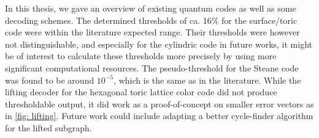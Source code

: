 In this thesis, we gave an overview of existing
quantum codes as well as some decoding schemes.
The determined thresholds of ca. 16\% for the surface/toric code were
within the literature expected range. 
Their thresholds were however not distinguishable, and
especially for the cylindric code in future works, it might be of interest to 
calculate these thresholds more precisely by using more significant computational
resources.
The pseudo-threshold for the Steane code was found to be around $10^{-5}$, which is
the same as in the literature. 
While the lifting decoder for the hexagonal toric lattice color code did not produce
thresholdable output, it did work as a proof-of-concept on smaller error vectors as in
\ref{fig: lifting}.
Future work could include adapting a better cycle-finder algorithm for the lifted 
subgraph.